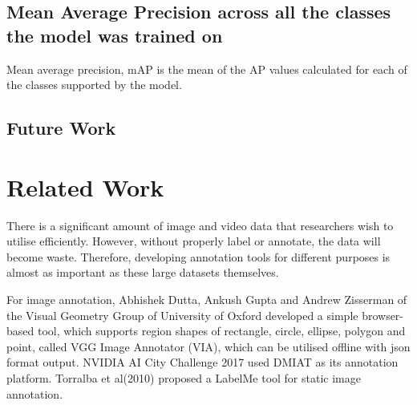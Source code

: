 \documentclass[conference]{IEEEtran}
\def\figref#1{Fig.~\ref{#1}}
\begin{document}
\subsection{Mean Average Precision across all the classes the model was trained on}
	Mean average precision, {mAP} is the mean of the {AP} values calculated for each of the classes supported by the model. 

\subsection{Future Work}





	








\section{Related Work}\label{sec.related}

There is a significant amount of image and video data that researchers wish to utilise efficiently. However, without properly label or annotate, the data will become waste. Therefore, developing annotation tools for different purposes is almost as important as these large datasets themselves.

For image annotation, Abhishek Dutta, Ankush Gupta and Andrew Zisserman of the Visual Geometry Group of University of Oxford developed a simple browser-based tool, which supports region shapes of rectangle, circle, ellipse, polygon and point, called VGG Image Annotator (VIA)\cite{abh2017via}, which can be utilised offline with json format output. NVIDIA AI City Challenge 2017 used DMIAT as its annotation platform. Torralba et al(2010)\cite{Russell2008labelme} proposed a LabelMe tool for static image annotation.  
\end{document}
